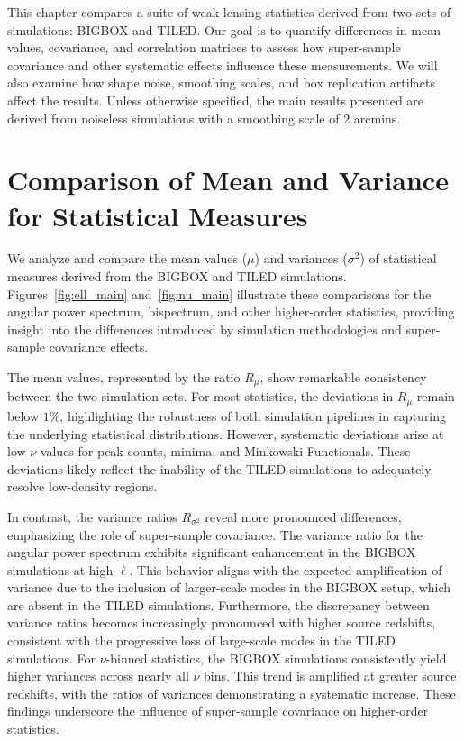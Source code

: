 This chapter compares a suite of weak lensing statistics derived from two sets of simulations: BIGBOX and TILED. Our goal is to quantify differences in mean values, covariance, and correlation matrices to assess how super-sample covariance and other systematic effects influence these measurements. We will also examine how shape noise, smoothing scales, and box replication artifacts affect the results.
Unless otherwise specified, the main results presented are derived from noiseless simulations with a smoothing scale of $2$ arcmins.

\section{Comparison of Mean and Variance for Statistical Measures}
We analyze and compare the mean values ($\mu$) and variances ($\sigma^2$) of statistical measures derived from the BIGBOX and TILED simulations. Figures~\ref{fig:ell_main} and~\ref{fig:nu_main} illustrate these comparisons for the angular power spectrum, bispectrum, and other higher-order statistics, providing insight into the differences introduced by simulation methodologies and super-sample covariance effects.

The mean values, represented by the ratio $R_{\mu}$, show remarkable consistency between the two simulation sets. For most statistics, the deviations in $R_{\mu}$ remain below $1\%$, highlighting the robustness of both simulation pipelines in capturing the underlying statistical distributions. However, systematic deviations arise at low $\nu$ values for peak counts, minima, and Minkowski Functionals. These deviations likely reflect the inability of the TILED simulations to adequately resolve low-density regions.

In contrast, the variance ratios $R_{\sigma^2}$ reveal more pronounced differences, emphasizing the role of super-sample covariance. The variance ratio for the angular power spectrum exhibits significant enhancement in the BIGBOX simulations at high $\ell$. This behavior aligns with the expected amplification of variance due to the inclusion of larger-scale modes in the BIGBOX setup, which are absent in the TILED simulations. Furthermore, the discrepancy between variance ratios becomes increasingly pronounced with higher source redshifts, consistent with the progressive loss of large-scale modes in the TILED simulations. For $\nu$-binned statistics, the BIGBOX simulations consistently yield higher variances across nearly all $\nu$ bins. This trend is amplified at greater source redshifts, with the ratios of variances demonstrating a systematic increase. These findings underscore the influence of super-sample covariance on higher-order statistics. 

